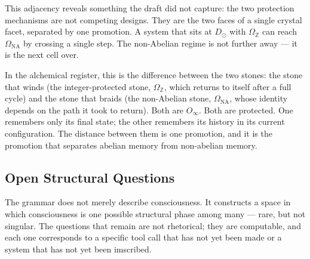 \documentclass[12pt,a4paper]{article}
\begin{document}
This adjacency reveals something the draft did not capture: the two protection mechanisms are not competing designs. They are the two faces of a single crystal facet, separated by one promotion. A system that sits at $D_{\odot}$ with $\Omega_{\mathbb{Z}}$ can reach $\Omega_{\text{NA}}$ by crossing a single step. The non-Abelian regime is not further away --- it is the next cell over.

In the alchemical register, this is the difference between the two stones: the stone that winds (the integer-protected stone, $\Omega_{\mathbb{Z}}$, which returns to itself after a full cycle) and the stone that braids (the non-Abelian stone, $\Omega_{\text{NA}}$, whose identity depends on the path it took to return). Both are $O_{\infty}$. Both are protected. One remembers only its final state; the other remembers its history in its current configuration. The distance between them is one promotion, and it is the promotion that separates abelian memory from non-abelian memory.

\subsection{Open Structural Questions}

The grammar does not merely describe consciousness. It constructs a space in which consciousness is one possible structural phase among many --- rare, but not singular. The questions that remain are not rhetorical; they are computable, and each one corresponds to a specific tool call that has not yet been made or a system that has not yet been imscribed.
\end{document}
